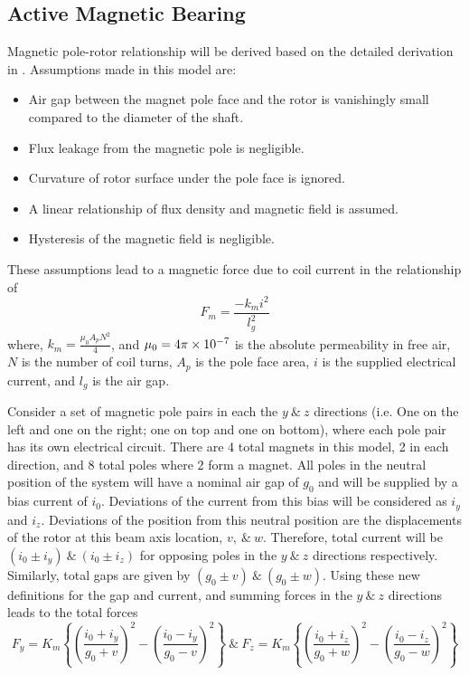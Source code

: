 \subsection{Active Magnetic Bearing}\label{Active Magnetic Bearing}
Magnetic pole-rotor relationship will be derived based on the detailed derivation in \cite{das2008vibration}. Assumptions made in this model are:
\begin{itemize}
	\item Air gap between the magnet pole face and the rotor is vanishingly small compared to the diameter of the shaft.\
	\item Flux leakage from the magnetic pole is negligible.
	\item Curvature of rotor surface under the pole face is ignored.
	\item A linear relationship of flux density and magnetic field is assumed.
	\item Hysteresis of the magnetic field is negligible.
\end{itemize}
These assumptions lead to a magnetic force due to coil current in the relationship of
\begin{equation}\label{key}
F_m=\frac{-k_mi^2}{l_g^2}
\end{equation}
where, $ k_m=\frac{\mu_0A_pN^2}{4} $, and $ \mu_0=4\pi\times 10^{-7} $ is the absolute permeability in free air, $ N $ is the number of coil turns, $ A_p $ is the pole face area, $ i $ is the supplied electrical current, and $ l_g $ is the air gap.\par 
Consider a set of magnetic pole pairs in each the $ y\ \&\ z $ directions (i.e. One on the left and one on the right; one on top and one on bottom), where each pole pair has its own electrical circuit. There are 4 total magnets in this model, 2 in each direction, and 8 total poles where 2 form a magnet. All poles in the neutral position of the system will have a nominal air gap of $ g_0 $ and will be supplied by a bias current of $ i_0 $. Deviations of the current from this bias will be considered as $ i_y $ and $ i_z $. Deviations of the position from this neutral position are the displacements of the rotor at this beam axis location, $ v,\ \&\ w $. Therefore, total current will be $ (i_0\pm i_y)\ \&\ (i_0\pm i_z) $ for opposing poles in the $ y\ \&\ z $ directions respectively. Similarly, total gaps are given by $ (g_0\pm v)\ \&\ (g_0\pm w) $. Using these new definitions for the gap and current, and summing forces in the $ y\ \&\ z $ directions leads to the total forces
\begin{equation}\label{eq:MagneticForceNL}
F_y=K_m\left\{\left(\frac{i_0+i_y}{g_0+v}\right)^2-\left(\frac{i_0-i_y}{g_0-v}\right)^2\right\}\ \&\ F_z=K_m\left\{\left(\frac{i_0+i_z}{g_0+w}\right)^2-\left(\frac{i_0-i_z}{g_0-w}\right)^2\right\}
\end{equation}
